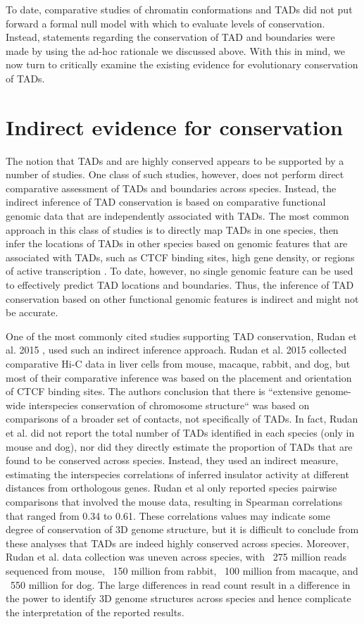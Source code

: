 To date, comparative studies of chromatin conformations and TADs did not put forward a formal null model with which to evaluate levels of conservation. Instead, statements regarding the conservation of TAD and boundaries were made by using the ad-hoc rationale we discussed above. With this in mind, we now turn to critically examine the existing evidence for evolutionary conservation of TADs.

\section{Indirect evidence for conservation}
The notion that TADs and are highly conserved appears to be supported by a number of studies. One class of such studies, however, does not perform direct comparative assessment of TADs and boundaries across species. Instead, the indirect inference of TAD conservation is based on comparative functional genomic data that are independently associated with TADs. The most common approach in this class of studies is to directly map TADs in one species, then infer the locations of TADs in other species based on genomic features that are associated with TADs, such as CTCF binding sites, high gene density, or regions of active transcription \cite{Dixon.2012, Nora.2012, Rudan.2015, Kentepozidou.2020, Dekker.2015}. To date, however, no single genomic feature can be used to effectively predict TAD locations and boundaries. Thus, the inference of TAD conservation based on other functional genomic features is indirect and might not be accurate. 

One of the most commonly cited studies supporting TAD conservation, Rudan et al. 2015 \cite{Rudan.2015}, used such an indirect inference approach. Rudan et al. 2015 \cite{Rudan.2015} collected comparative Hi-C data in liver cells from mouse, macaque, rabbit, and dog, but most of their comparative inference was based on the placement and orientation of CTCF binding sites. The authors conclusion that there is ``extensive genome-wide interspecies conservation of chromosome structure`` was based on comparisons of a broader set of contacts, not specifically of TADs. In fact, Rudan et al. did not report the total number of TADs identified in each species (only in mouse and dog), nor did they directly estimate the proportion of TADs that are found to be conserved across species. Instead, they used an indirect measure, estimating the interspecies correlations of inferred insulator activity \cite{Sofueva.2013} at different distances from orthologous genes. Rudan et al only reported species pairwise comparisons that involved the mouse data, resulting in Spearman correlations that ranged from 0.34 to 0.61. These correlations values may indicate some degree of conservation of 3D genome structure, but it is difficult to conclude from these analyses that TADs are indeed highly conserved across species. Moreover, Rudan et al. data collection was uneven across species, with ~275 million reads sequenced from mouse, ~150 million from rabbit, ~100 million from macaque, and ~550 million for dog. The large differences in read count result in a difference in the power to identify 3D genome structures across species and hence complicate the interpretation of the reported results. 

